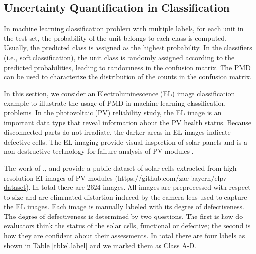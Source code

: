 \documentclass[12pt]{article}
\begin{document}
\subsection{Uncertainty Quantification in Classification}
In machine learning classification problem with multiple labels, for each unit in the test set, the probability of the unit belongs to each class is computed. Usually, the predicted class is assigned as the highest probability. In the classifiers (i.e., soft classification), the unit class is randomly assigned according to the predicted probabilities, leading to randomness in the confusion matrix. The PMD can be used to characterize the distribution of the counts in the confusion matrix.


%

In this section, we consider an Electroluminescence (EL) image classification example to illustrate the usage of PMD in machine learning classification problems. In the photovoltaic (PV) reliability study, the EL image is an important data type that reveal information about the PV health status. Because disconnected parts do not irradiate, the darker areas in EL images indicate defective cells. The EL imaging provide visual inspection of solar panels and is a non-destructive technology for failure analysis of PV modules .

The work of ,, and  provide a public dataset of solar cells extracted from high resolution EI images of PV modules (\url{https://github.com/zae-bayern/elpv-dataset}). In total there are 2624 images. All images are preprocessed with respect to size and are eliminated distortion induced by the camera lens used to capture the EL images. Each image is manually labeled  with its degree of defectiveness. The degree of defectiveness is determined by two questions. The first is how do evaluators think the status of the solar cells, functional or defective; the second is how they are confident about their assessments. In total there are four labels as shown in Table \ref{tbl:el.label} and we marked them as Class A-D.
\end{document}
